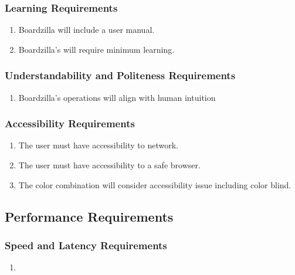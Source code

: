 \documentclass[]{article}
\begin{document}
\subsubsection{Learning Requirements}
\label{ssub:learning_requirements}
\begin{enumerate}[{UH}1. ]
	\item Boardzilla will include a user manual.
	\item Boardzilla's will require minimum learning.
\end{enumerate}

\subsubsection{Understandability and Politeness Requirements}
\label{ssub:understandability_and_politeness_requirements}
\begin{enumerate}[{UH}1. ]
	\item Boardzilla's operations will align with human intuition
\end{enumerate}

\subsubsection{Accessibility Requirements}
\label{ssub:accessibility_requirements}
\begin{enumerate}[{UH}1. ]
	\item The user must have accessibility to network. 
	\item The user must have accessibility to a safe browser. 
	\item The color combination will consider accessibility issue including color blind.
\end{enumerate}


\subsection{Performance Requirements}
\label{sub:performance_requirements}

\subsubsection{Speed and Latency Requirements}
\label{ssub:speed_and_latency_requirements}
\begin{enumerate}[{PR}1. ]
	\item 
\end{enumerate}
\end{document}
